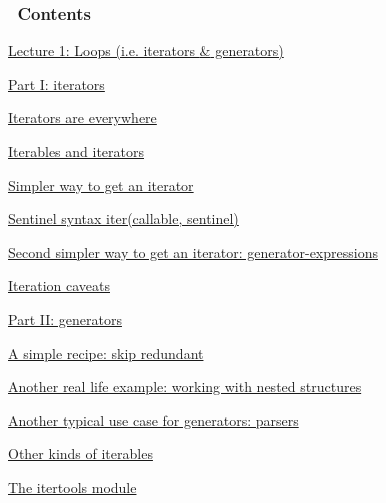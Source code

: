 \documentclass[10pt,a4paper,english]{article}
\begin{document}
\subsubsection*{~\hfill Contents\hfill ~}
\begin{list}{}{}
\item {} \href{\#lecture-1-loops-i-e-iterators-generators}{Lecture 1: Loops (i.e. iterators {\&} generators)}
\begin{list}{}{}
\item {} \href{\#part-i-iterators}{Part I: iterators}
\begin{list}{}{}
\item {} \href{\#iterators-are-everywhere}{Iterators are everywhere}

\item {} \href{\#iterables-and-iterators}{Iterables and iterators}

\item {} \href{\#simpler-way-to-get-an-iterator}{Simpler way to get an iterator}

\item {} \href{\#sentinel-syntax-iter-callable-sentinel}{Sentinel syntax iter(callable, sentinel)}

\item {} \href{\#second-simpler-way-to-get-an-iterator-generator-expressions}{Second simpler way to get an iterator: generator-expressions}

\item {} \href{\#iteration-caveats}{Iteration caveats}

\end{list}

\item {} \href{\#part-ii-generators}{Part II: generators}
\begin{list}{}{}
\item {} \href{\#a-simple-recipe-skip-redundant}{A simple recipe: skip redundant}

\item {} \href{\#another-real-life-example-working-with-nested-structures}{Another real life example: working with nested structures}

\item {} \href{\#another-typical-use-case-for-generators-parsers}{Another typical use case for generators: parsers}

\item {} \href{\#other-kinds-of-iterables}{Other kinds of iterables}

\item {} \href{\#the-itertools-module}{The itertools module}


\end{list}
\end{list}
\end{list}
\end{document}
